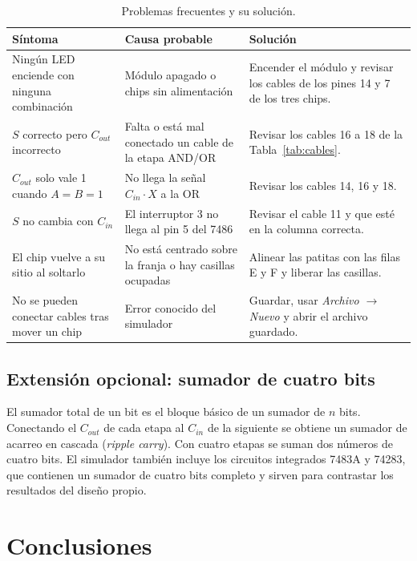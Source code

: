 \documentclass[10pt]{article}
\begin{document}
\begin{table}[!htbp]
  \centering
  \caption{Problemas frecuentes y su solución.}
  \label{tab:problemas}
  \begin{tabular}{p{4.3cm}p{4.8cm}p{5cm}}
    \toprule
    Síntoma & Causa probable & Solución \\
    \midrule
    Ningún LED enciende con ninguna combinación &
    Módulo apagado o chips sin alimentación &
    Encender el módulo y revisar los cables de los pines 14 y 7 de los tres chips. \\
    $S$ correcto pero $C_{out}$ incorrecto &
    Falta o está mal conectado un cable de la etapa AND/OR &
    Revisar los cables 16 a 18 de la Tabla~\ref{tab:cables}. \\
    $C_{out}$ solo vale 1 cuando $A=B=1$ &
    No llega la señal $C_{in}\cdot X$ a la OR &
    Revisar los cables 14, 16 y 18. \\
    $S$ no cambia con $C_{in}$ &
    El interruptor 3 no llega al pin 5 del 7486 &
    Revisar el cable 11 y que esté en la columna correcta. \\
    El chip vuelve a su sitio al soltarlo &
    No está centrado sobre la franja o hay casillas ocupadas &
    Alinear las patitas con las filas E y F y liberar las casillas. \\
    No se pueden conectar cables tras mover un chip &
    Error conocido del simulador &
    Guardar, usar \textit{Archivo $\rightarrow$ Nuevo} y abrir el archivo guardado. \\
    \bottomrule
  \end{tabular}
\end{table}

\subsection{Extensión opcional: sumador de cuatro bits}

El sumador total de un bit es el bloque básico de un sumador de $n$ bits.
Conectando el $C_{out}$ de cada etapa al $C_{in}$ de la siguiente se obtiene un
sumador de acarreo en cascada (\textit{ripple carry}). Con cuatro etapas se
suman dos números de cuatro bits. El simulador también incluye los circuitos
integrados 7483A y 74283, que contienen un sumador de cuatro bits completo y
sirven para contrastar los resultados del diseño propio.

\section{Conclusiones}
\end{document}
